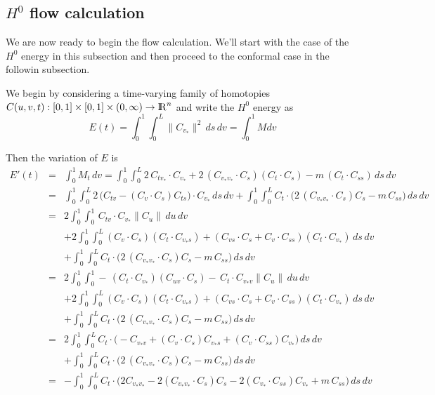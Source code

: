 \documentclass[twoside,a4paper,english]{article}
\def\v{{v_*}}
\begin{document}
\subsection{$H^0$ flow calculation}

We are now ready to begin the flow calculation. We'll start with the
case of the $H^0$ energy in this subsection and then proceed to
the conformal case in the followin subsection.

We begin by considering a time-varying family of homotopies
$C(u,v,t):[0,1]\times [0,1]\times (0,\infty)\to {\protect\mathrm{l\hskip-0.15em R}} ^n$
and write the $H^0$ energy as
\begin{equation}
  E(t)=\int_0^1\int_0^L \big\|C_{\v}\big\|^2\,ds\,dv
      =\int_0^1 M dv
\end{equation}

Then the variation of $E$ is
\begin{eqnarray*}
  E'(t)
  &=& \int_0^1 M_t\,dv 
     =\int_0^1
        \int_0^L 2\,C_{t\v}\cdot C_{\v}
               + 2\,(C_{\v\v}\cdot C_s)(C_t\cdot C_s)
               - m\,(C_t\cdot C_{ss})\,ds
      \,dv \\
  &=& \int_0^1\int_0^L
        2\,\Big(C_{tv}-(C_v\cdot C_s)C_{ts}\Big)\cdot C_{\v}
      \,ds\,dv
     +\int_0^1\int_0^L
        C_t\cdot\Big(
          2\,(C_{\v\v}\cdot C_s)C_s-m\,C_{ss}
        \Big)
      \,ds\,dv \\
  &=& 2\int_0^1\int_0^1
        \,C_{tv}\cdot C_{\v}
      \|C_u\|\,du\,dv
    \\&&
     +2\int_0^1\int_0^L
        (C_v\cdot C_s)(C_t\cdot C_{\v s})
       +(C_{vs}\cdot C_s+C_v\cdot C_{ss})(C_t\cdot C_{\v})
      \,ds\,dv
    \\&&
     +\int_0^1\int_0^L
        C_t\cdot\Big(
          2\,(C_{\v\v}\cdot C_s)C_s-m\,C_{ss}
        \Big)
      \,ds\,dv \\
  &=& 2\int_0^1\int_0^1
       -\,(C_t\cdot C_{\v})(C_{uv}\cdot C_s)
       -\,C_t\cdot C_{\v v}\|C_u\|
      \,du\,dv
    \\&&
     +2\int_0^1\int_0^L
        (C_v\cdot C_s)(C_t\cdot C_{\v s})
       +(C_{vs}\cdot C_s+C_v\cdot C_{ss})(C_t\cdot C_{\v})
      \,ds\,dv
    \\&&
     +\int_0^1\int_0^L
        C_t\cdot\Big(
          2\,(C_{\v\v}\cdot C_s)C_s-m\,C_{ss}
        \Big)
      \,ds\,dv \\
  &=& 2\int_0^1\int_0^L
        C_t\cdot\Big(
         -C_{\v v}
         +(C_v\cdot C_s)C_{\v s}
         +(C_v\cdot C_{ss})C_{\v}
        \Big)
      \,ds\,dv
    \\&&
     +\int_0^1\int_0^L
        C_t\cdot\Big(
          2\,(C_{\v\v}\cdot C_s)C_s-m\,C_{ss}
        \Big)
      \,ds\,dv \\
  &=& -\int_0^1\int_0^L
        C_t\cdot\Big(
          2C_{\v\v}-2(C_{\v\v}\cdot C_s)C_s
         -2(C_{\v}\cdot C_{ss})C_{\v}
         +m\,C_{ss}
        \Big)
      \,ds\,dv
\end{eqnarray*}
\end{document}

